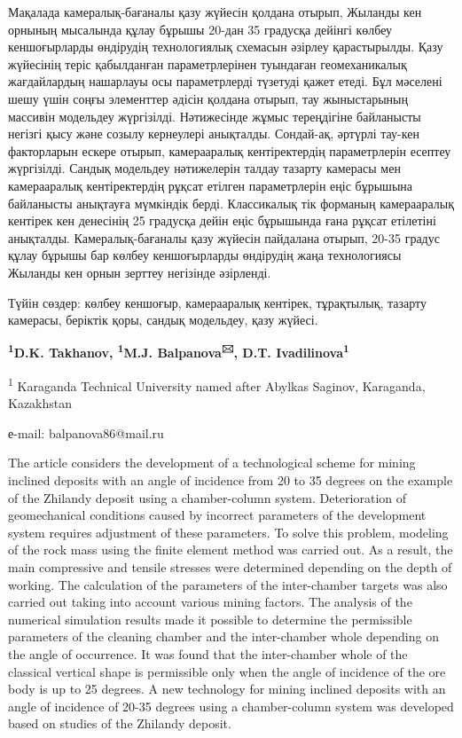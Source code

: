 Мақалада камералық-бағаналы қазу жүйесін қолдана отырып, Жыланды кен
орнының мысалында құлау бұрышы 20-дан 35 градусқа дейінгі көлбеу
кеншоғырларды өндірудің технологиялық схемасын әзірлеу қарастырылды.
Қазу жүйесінің теріс қабылданған параметрлерінен туындаған
геомеханикалық жағдайлардың нашарлауы осы параметрлерді түзетуді қажет
етеді. Бұл мәселені шешу үшін соңғы элементтер әдісін қолдана отырып,
тау жыныстарының массивін модельдеу жүргізілді. Нәтижесінде жұмыс
тереңдігіне байланысты негізгі қысу және созылу кернеулері анықталды.
Сондай-ақ, әртүрлі тау-кен факторларын ескере отырып, камерааралық
кентіректердің параметрлерін есептеу жүргізілді. Сандық модельдеу
нәтижелерін талдау тазарту камерасы мен камерааралық кентіректердің
рұқсат етілген параметрлерін еңіс бұрышына байланысты анықтауға
мүмкіндік берді. Классикалық тік форманың камерааралық кентірек кен
денесінің 25 градусқа дейін еңіс бұрышында ғана рұқсат етілетіні
анықталды. Камералық-бағаналы қазу жүйесін пайдалана отырып, 20-35
градус құлау бұрышы бар көлбеу кеншоғырларды өндірудің жаңа технологиясы
Жыланды кен орнын зерттеу негізінде әзірленді.

Түйін сөздер: көлбеу кеншоғыр, камерааралық кентірек, тұрақтылық,
тазарту камерасы, беріктік қоры, сандық модельдеу, қазу жүйесі.


\begin{center}
{\bfseries \textsuperscript{1}D.K. Takhanov, \textsuperscript{1}M.J.
Balpanova\textsuperscript{🖂}, D.T. Ivadilinova\textsuperscript{1}}

\textsuperscript{1} Karaganda Technical University named after Abylkas
Saginov, Karaganda, Kazakhstan

е-mail: balpanova86@mail.ru
\end{center}

The article considers the development of a technological scheme for
mining inclined deposits with an angle of incidence from 20 to 35
degrees on the example of the Zhilandy deposit using a chamber-column
system. Deterioration of geomechanical conditions caused by incorrect
parameters of the development system requires adjustment of these
parameters. To solve this problem, modeling of the rock mass using the
finite element method was carried out. As a result, the main compressive
and tensile stresses were determined depending on the depth of working.
The calculation of the parameters of the inter-chamber targets was also
carried out taking into account various mining factors. The analysis of
the numerical simulation results made it possible to determine the
permissible parameters of the cleaning chamber and the inter-chamber
whole depending on the angle of occurrence. It was found that the
inter-chamber whole of the classical vertical shape is permissible only
when the angle of incidence of the ore body is up to 25 degrees. A new
technology for mining inclined deposits with an angle of incidence of
20-35 degrees using a chamber-column system was developed based on
studies of the Zhilandy deposit.

